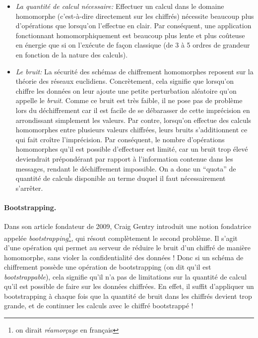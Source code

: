 \begin{itemize}
	\item \textit{La quantité de calcul nécessaire:} Effectuer un calcul dans le domaine homomorphe (c'est-à-dire directement sur les chiffrés) nécessite beaucoup plus d'opérations que lorsqu'on l'effectue en clair. Par conséquent, une application fonctionnant homomorphiquement est beaucoup plus lente et plus coûteuse en énergie que si on l'exécute de façon classique (de 3 à 5 ordres de grandeur en fonction de la nature des calculs). 
	\item \textit{Le bruit:} La sécurité des schémas de chiffrement homomorphes reposent sur la théorie des réseaux euclidiens. Concrètement, cela signifie que lorsqu'on chiffre les données on leur ajoute une petite perturbation aléatoire qu'on appelle le \textit{bruit}. Comme ce bruit est très faible, il ne pose pas de problème lors du déchiffrement car il est facile de se débarasser de cette imprécision en arrondissant simplement les valeurs. Par contre, lorsqu'on effectue des calculs homomorphes entre plusieurs valeurs chiffrées, leurs bruits s'additionnent ce qui fait croître l'imprécision. Par conséquent, le nombre d'opérations homomorphes qu'il est possible d'effectuer est limité, car un bruit trop élevé deviendrait prépondérant par rapport à l'information contenue dans les messages, rendant le déchiffrement impossible. On a donc un ``quota'' de quantité de calculs disponible  au terme duquel il faut nécessairement s'arrêter.
\end{itemize}


\paragraph{Bootstrapping.}
Dans son article fondateur de 2009, Craig Gentry introduit une notion fondatrice appelée \textit{bootstrapping}\footnote{on dirait \textit{réamorçage} en français}, qui résout complètement le second problème. Il s'agit d'une opération qui permet au serveur de réduire le bruit d'un chiffré de manière homomorphe, sans violer la confidentialité des données ! Donc si un schéma de chiffrement possède une opération de bootstrapping (on dit qu'il est \textit{bootstrappable}), cela signifie qu'il n'a pas de limitations sur la quantité de calcul qu'il est possible de faire sur les données chiffrées. En effet, il suffit d'appliquer un bootstrapping à chaque fois que la quantité de bruit dans les chiffrés devient trop grande, et de continuer les calculs avec le chiffré bootstrappé !


